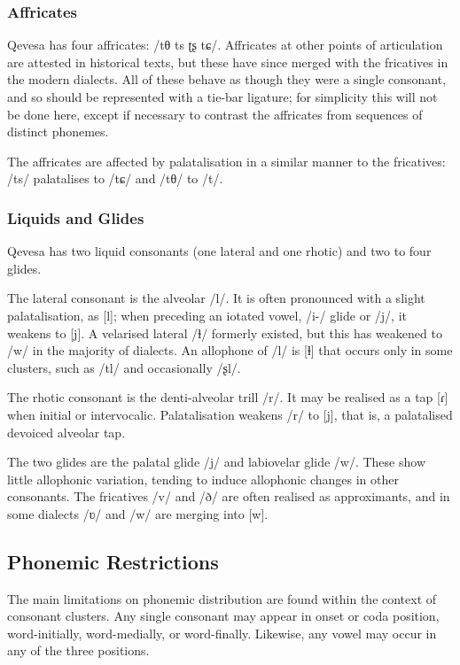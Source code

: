 \documentclass[grammar]{subfiles}
\begin{document}
	\subsubsection{Affricates}
	\label{sssec:affricates}

	Qevesa has four affricates: /tθ ts ʈʂ tɕ/. Affricates at other points of articulation are attested in historical texts, but these have since merged with the fricatives in the modern dialects. All of these behave as though they were a single consonant, and so should be represented with a tie-bar ligature; for simplicity this will not be done here, except if necessary to contrast the affricates from sequences of distinct phonemes. 

	The affricates are affected by palatalisation in a similar manner to the fricatives: /ts/ palatalises to /tɕ/ and /tθ/ to /t/.

	\subsubsection{Liquids and Glides}
	\label{sssec:liquids}

	Qevesa has two liquid consonants (one lateral and one rhotic) and two to four glides.

	The lateral consonant is the alveolar /l/. It is often pronounced with a slight palatalisation, as [l\superj]; when preceding an iotated vowel, /i-/ glide or /j/, it weakens to [j]. A velarised lateral /ɫ/ formerly existed, but this has weakened to /w/ in the majority of dialects. An allophone of /l/ is [ɬ] that occurs only in some clusters, such as /tl/ and occasionally /ʂl/.

	The rhotic consonant is the denti-alveolar trill /r/. It may be realised as a tap [ɾ] when initial or intervocalic. Palatalisation weakens /r/ to [j], that is, a palatalised devoiced alveolar tap.

	The two glides are the palatal glide /j/ and labiovelar glide /w/. These show little allophonic variation, tending to induce allophonic changes in other consonants. The fricatives /v/ and /ð/ are often realised as approximants, and in some dialects /ʋ/ and /w/ are merging into [w].

	\subsection{Phonemic Restrictions}
	\label{ssec:phonemic_restrictions}

	The main limitations on phonemic distribution are found within the context of consonant clusters. Any single consonant may appear in onset or coda position, word-initially, word-medially, or word-finally. Likewise, any vowel may occur in any of the three positions. 
\end{document}

